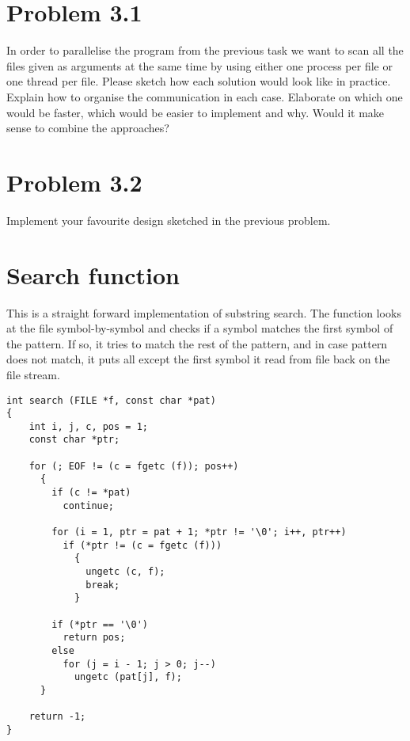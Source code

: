 \documentclass[a4paper,10pt]{scrartcl}
\begin{document}
    \section{Problem 3.1}
    In order to parallelise the program from the previous task we want
    to scan all the files given as arguments at the same time by using 
    either one process per file or one thread per file.  Please sketch
    how each solution would look like in practice.  Explain how to
    organise the communication in each case.  Elaborate on which one
    would be faster, which would be easier to implement and why.  Would it make
    sense to combine the approaches?

    \section{Problem 3.2}
    Implement your favourite design sketched in the previous problem.

    \appendix
    \pagebreak
    \section{Search function}

    This is a straight forward implementation of substring search.
    The function looks at the file symbol-by-symbol and checks if a
    symbol matches the first symbol of the pattern.  If so, it tries to
    match the rest of the pattern, and in case pattern does not match,
    it puts all except the first symbol it read from file back on the
    file stream.
    \begin{verbatim}
int search (FILE *f, const char *pat)
{
    int i, j, c, pos = 1;
    const char *ptr;

    for (; EOF != (c = fgetc (f)); pos++) 
      {
        if (c != *pat)
          continue;

        for (i = 1, ptr = pat + 1; *ptr != '\0'; i++, ptr++)
          if (*ptr != (c = fgetc (f))) 
            {
              ungetc (c, f);
              break;
            }

        if (*ptr == '\0')
          return pos;
        else
          for (j = i - 1; j > 0; j--)
            ungetc (pat[j], f);
      }

    return -1;
}
    \end{verbatim}
 
\end{document}
